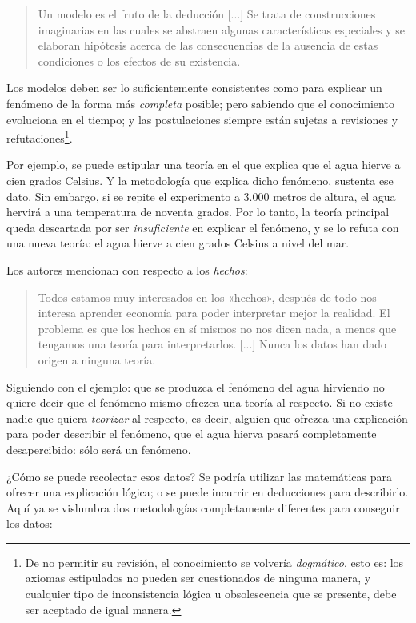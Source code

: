 \documentclass[12pt,a4paper,twoside]{book}
\begin{document}
\begin{quotation}
Un modelo es el fruto de la deducción [...] Se trata de construcciones imaginarias en las cuales se abstraen algunas características especiales y se elaboran hipótesis acerca de las consecuencias de la ausencia de estas condiciones o los efectos de su existencia. \cite[pág. 25]{elementos-econopol}
\end{quotation}

Los modelos deben ser lo suficientemente consistentes como para explicar un fenómeno de la forma más \textit{completa} posible; pero sabiendo que el conocimiento evoluciona en el tiempo; y las postulaciones siempre están sujetas a revisiones y refutaciones\footnote{De no permitir su revisión, el conocimiento se volvería \textit{dogmático}, esto es: los axiomas estipulados no pueden ser cuestionados de ninguna manera, y cualquier tipo de inconsistencia lógica u obsolescencia que se presente, debe ser aceptado de igual manera.}.

Por ejemplo, se puede estipular una teoría en el que explica que el agua hierve a cien grados Celsius. Y la metodología que explica dicho fenómeno, sustenta ese dato. Sin embargo, si se repite el experimento a 3.000 metros de altura, el agua hervirá a una temperatura de noventa grados. Por lo tanto, la teoría principal queda descartada por ser \textit{insuficiente} en explicar el fenómeno, y se lo refuta con una nueva teoría: el agua hierve a cien grados Celsius a nivel del mar.

Los autores mencionan con respecto a los \textit{hechos}:

\begin{quotation}
Todos estamos muy interesados en los «hechos», después de todo nos interesa aprender economía para poder interpretar mejor la realidad. El problema es que los hechos en sí mismos no nos dicen nada, a menos que tengamos una teoría para interpretarlos. [...] Nunca los datos han dado origen a ninguna teoría. \cite[pág. 28]{elementos-econopol}
\end{quotation}

Siguiendo con el ejemplo: que se produzca el fenómeno del agua hirviendo no quiere decir que el fenómeno mismo ofrezca una teoría al respecto. Si no existe nadie que quiera \textit{teorizar} al respecto, es decir, alguien que ofrezca una explicación para poder describir el fenómeno, que el agua hierva pasará completamente desapercibido: sólo será un fenómeno.

¿Cómo se puede recolectar esos datos? Se podría utilizar las matemáticas para ofrecer una explicación lógica; o se puede incurrir en deducciones para describirlo. Aquí ya se vislumbra dos metodologías completamente diferentes para conseguir los datos:
\end{document}
